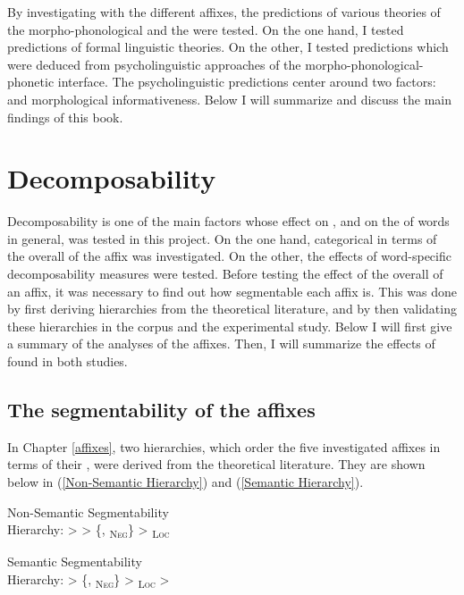 By investigating  with the different affixes, the predictions of various theories of the morpho-phonological and the  were tested. On the one hand, I tested predictions of formal linguistic theories. On the other, I tested predictions which were deduced from psycholinguistic approaches of the morpho-phonological-phonetic interface. The psycholinguistic predictions center around two factors:  and morphological informativeness.  Below I will summarize and discuss the main findings of this book.



\section{Decomposability}

Decomposability is one of the main factors whose effect on , and on the  of words in general, was tested in this project. On the one hand, categorical  in terms of the overall  of the affix was investigated. On the other, the effects of word-specific decomposability measures were tested. 
Before testing the effect of the overall  of an affix, it was necessary to find out how segmentable each affix is. This was done by first deriving  hierarchies from the theoretical literature, and by then validating these hierarchies  in the corpus and the experimental study. Below I will first give a summary of the  analyses of the affixes. Then, I will summarize the effects of  found in both studies.



\subsection{The segmentability of the affixes}

In Chapter \ref{affixes}, two  hierarchies, which order the five investigated affixes in terms of their , were derived from the theoretical literature. They are shown below in (\ref{Non-Semantic Hierarchy})  and (\ref{Semantic Hierarchy}). 


	\begin{exe}
		\ex \label{Non-Semantic Hierarchy} {Non-Semantic Segmentability }\\
		Hierarchy:\hspace*{3.5cm}   >  > \{, \textsubscript{\textsc{Neg}}\} >  \textsubscript{\textsc{Loc}}
		
				\ex \label{Semantic Hierarchy} 	{Semantic Segmentability }\\
				Hierarchy: \hspace*{3.5cm}  > \{, \textsubscript{\textsc{Neg}}\} >  \textsubscript{\textsc{Loc}} > 
	\end{exe}

